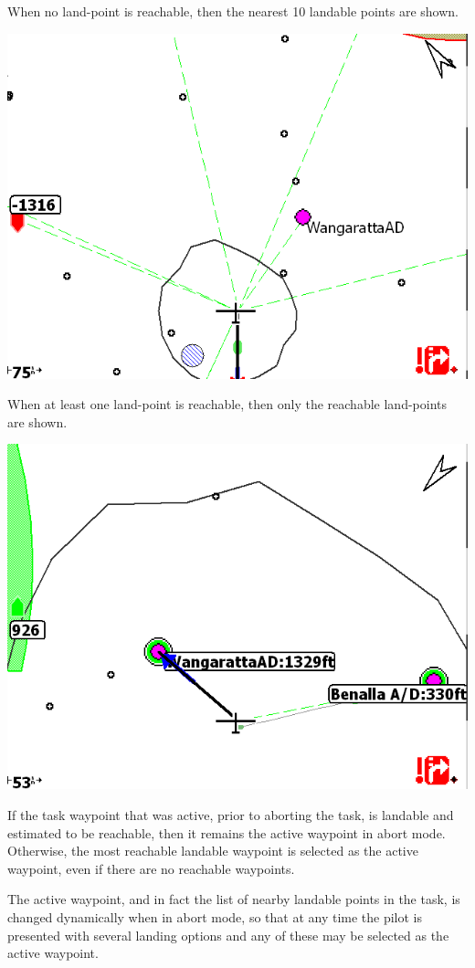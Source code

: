 \documentclass[a4paper,12pt]{refrep}
\begin{document}
When no land-point is reachable, then the nearest 10 landable points
are shown. 

\begin{center}
\includegraphics[angle=0,width=0.8\linewidth,keepaspectratio='true']{figures/abort-low.png}
\end{center}

When at least one land-point is reachable, then only the reachable land-points are shown.

\begin{center}
\includegraphics[angle=0,width=0.8\linewidth,keepaspectratio='true']{figures/abort-high.png}
\end{center}

If the task waypoint that was active, prior to aborting the task, is
landable and estimated to be reachable, then it remains the active
waypoint in abort mode.  Otherwise, the most reachable landable
waypoint is selected as the active waypoint, even if there are no
reachable waypoints.

The active waypoint, and in fact the list of nearby landable points in
the task, is changed dynamically when in abort mode, so that at any
time the pilot is presented with several landing options and any of
these may be selected as the active waypoint.
\end{document}
